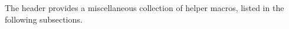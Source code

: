 The header   provides a miscellaneous
collection of helper macros, listed in the following subsections.

\subsection{}


\subsection{}


\subsection{}


\subsection{}


\subsection{}


\subsection{}


\subsection{}


\subsection{}

